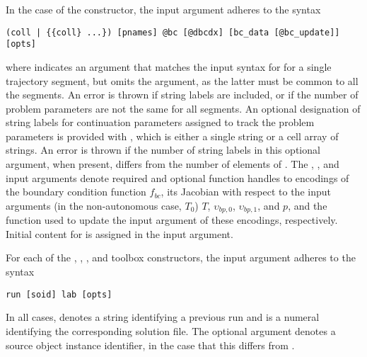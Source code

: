 In the case of the  constructor, the  input argument adheres to the syntax
\begin{lstlisting}[language=coco-highlight]
(coll | {{coll} ...}) [pnames] @bc [@dbcdx] [bc_data [@bc_update]] [opts]
\end{lstlisting}
where  indicates an argument that matches the  input syntax for  for a single trajectory segment, but omits the  argument, as the latter must be common to all the segments.  An error is thrown if string labels are included, or if the number of problem parameters are not the same for all segments. An optional designation of string labels for continuation parameters assigned to track the problem parameters is provided with , which is either a single string or a cell array of strings. An error is thrown if the number of string labels in this optional argument, when present, differs from the number of elements of . The , , and  input arguments denote required and optional function handles to encodings of the boundary condition function $f_{bc}$, its Jacobian with respect to the input arguments (in the non-autonomous case, $T_0$) $T$, $\upsilon_{bp,0}$, $\upsilon_{bp,1}$, and $p$, and the function used to update the  input argument of these encodings, respectively. Initial content for  is assigned in the  input argument.

For each of the , , , and  toolbox constructors, the  input argument adheres to the syntax
\begin{lstlisting}[language=coco-highlight]
run [soid] lab [opts]
\end{lstlisting}
In all cases,  denotes a string identifying a previous run and  is a numeral identifying the corresponding solution file. The optional argument  denotes a source object instance identifier, in the case that this differs from .

